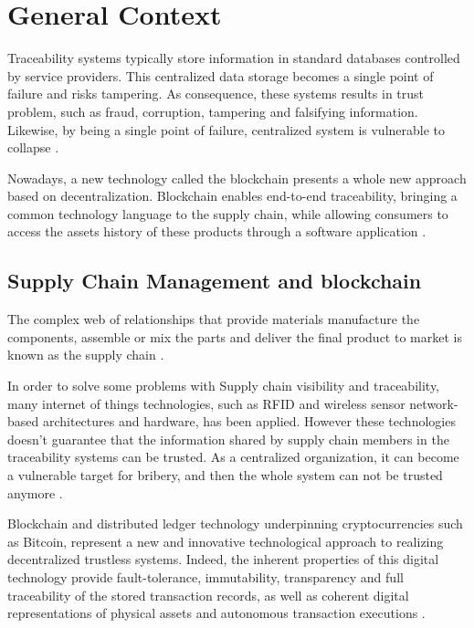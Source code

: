 \section{General Context} \label{sec:General}

Traceability systems typically store information in standard databases controlled by service providers. This centralized data storage becomes a single point of failure and risks tampering. As consequence, these systems results in trust problem, such as fraud, corruption, tampering and falsifying information. Likewise, by being a single point of failure, centralized system is vulnerable to collapse \cite{tian2017supply}.

Nowadays, a new technology called the blockchain presents a whole new approach based on decentralization. Blockchain enables end-to-end traceability, bringing a common technology language to the supply chain, while allowing consumers to access the assets history of these products through a software application \cite{galvez2018future}.


\subsection{Supply Chain Management and blockchain}\label{sec:scm}

The complex web of relationships that provide materials manufacture the components, assemble or mix the parts and deliver the final product to market is known as the supply chain \cite{buurman2002supply}.

In order to solve some problems with Supply chain visibility and traceability, many internet of things technologies, such as RFID and wireless sensor network-based architectures and hardware, has been applied. However these technologies doesn't guarantee that the information shared by supply chain members in the traceability systems can be trusted. As a centralized organization, it can become a vulnerable target for bribery, and then the whole system can not be trusted anymore \cite{tian2017supply}.

Blockchain and distributed ledger technology underpinning cryptocurrencies such as Bitcoin, represent a new and innovative technological approach to realizing decentralized trustless systems. Indeed, the inherent properties of this digital technology provide fault-tolerance, immutability, transparency and full traceability of the stored transaction records, as well as coherent digital representations of physical assets and autonomous transaction executions \cite{caro2018blockchain}.

